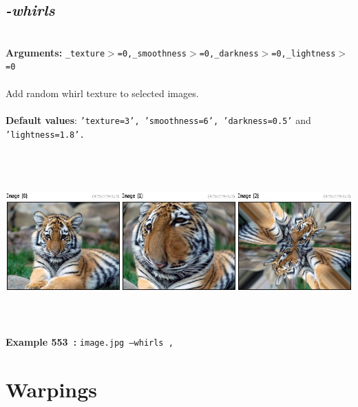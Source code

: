 \documentclass[a4paper,11pt,twoside]{book}
\begin{document}
\subsection{\emph{-whirls} }\vspace*{-0.5em}
~\\\textbf{Arguments: } 
{\small \texttt{\_texture$>$=0,\_smoothness$>$=0,\_darkness$>$=0,\_lightness$>$=0}}\\~\\
Add random whirl texture to selected images.
~\\~\\\textbf{Default values}: {\small \texttt{'texture=3', 'smoothness=6', 'darkness=0.5'} and \texttt{'lightness=1.8'.}}
\begin{center}\includegraphics[keepaspectratio=true,height=7cm,width=\textwidth]{img/gmic_def553.jpg}\\
{\footnotesize \textbf{Example 553~:} \texttt{image.jpg --whirls ,}}
\end{center}
\section{Warpings}
\end{document}

